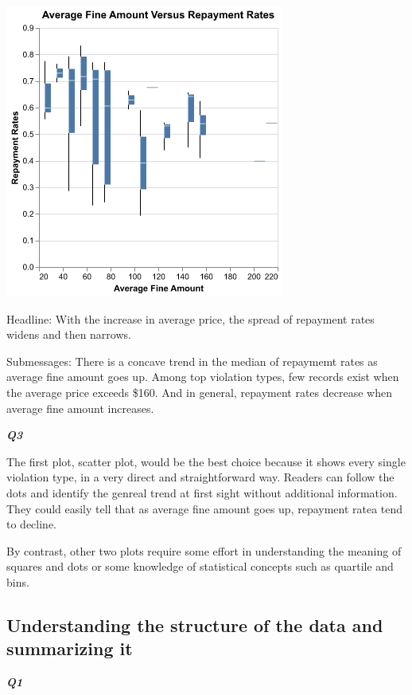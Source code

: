 \documentclass[
  letterpaper,
  DIV=11,
  numbers=noendperiod]{scrartcl}
\begin{document}
\includegraphics[width=3.61458in,height=3.79167in]{PS2 Answer_files/figure-pdf/cell-17-output-1.png}

Headline: With the increase in average price, the spread of repayment
rates widens and then narrows.

Submessages: There is a concave trend in the median of repaymemt rates
as average fine amount goes up. Among top violation types, few records
exist when the average price exceeds \$160. And in general, repayment
rates decrease when average fine amount increases.

\textbf{\emph{Q3}}

The first plot, scatter plot, would be the best choice because it shows
every single violation type, in a very direct and straightforward way.
Readers can follow the dots and identify the genreal trend at first
sight without additional information. They could easily tell that as
average fine amount goes up, repayment ratea tend to decline.

By contrast, other two plots require some effort in understanding the
meaning of squares and dots or some knowledge of statistical concepts
such as quartile and bins.

\subsection{Understanding the structure of the data and summarizing
it}\label{understanding-the-structure-of-the-data-and-summarizing-it}

\textbf{\emph{Q1}}
\end{document}
